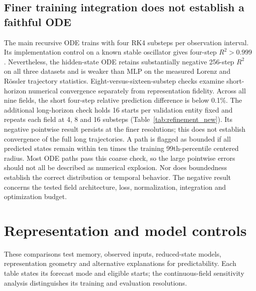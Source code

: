\documentclass[10pt,a4paper,twocolumn]{article}
\begin{document}
\subsection{Finer training integration does not establish a faithful ODE}
The main recursive ODE trains with four RK4 substeps per observation interval.
Its implementation control on a known stable oscillator gives four-step $R^2>0.999$.
Nevertheless, the hidden-state ODE retains substantially negative 256-step $R^2$ on all three datasets and is weaker than MLP on the measured Lorenz and R\"ossler trajectory statistics.
Eight-versus-sixteen-substep checks examine short-horizon numerical convergence separately from representation fidelity.
Across all nine fields, the short four-step relative prediction difference is below 0.1\%.
The additional long-horizon check holds 16 starts per validation entity fixed and repeats each field at 4, 8 and 16 substeps (Table~\ref{tab:refinement_new}).
Its negative pointwise result persists at the finer resolutions; this does not establish convergence of the full long trajectories.
A path is flagged as bounded if all predicted states remain within ten times the training 99th-percentile centered radius.
Most ODE paths pass this coarse check, so the large pointwise errors should not all be described as numerical explosion.
Nor does boundedness establish the correct distribution or temporal behavior.
The negative result concerns the tested field architecture, loss, normalization, integration and optimization budget.

\begin{table}[t]
\centering\small
\setlength{\tabcolsep}{3pt}

\caption{ODE validation $R^2$ at $k=256$ under integration refinement, averaged over three frozen fields. All resolutions use the same 16 starts per validation entity. This smaller path subset differs from the full main reporting manifest.}
\label{tab:refinement_new}
\end{table}

\section{Representation and model controls}
These comparisons test memory, observed inputs, reduced-state models, representation geometry and alternative explanations for predictability.
Each table states its forecast mode and eligible starts; the continuous-field sensitivity analysis distinguishes its training and evaluation resolutions.
\begin{table}[t]
\centering\small

\caption{Validation $R^2$ on unseen series, four entities per primary dataset.
Models within a horizon use identical anchors.
MLP and ODE columns average three seeds.
Ridge and MLP are direct $k$-step fits; persistence repeats the initial state.
History uses the current and previous states; observation input is the current past-only patch.
Seed standard deviations and both protocols are in the accompanying rounded result table.}
\label{tab:short}
\end{table}
\end{document}
